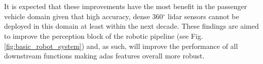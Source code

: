 \\\\
It is expected that these improvements have the most benefit in the passenger vehicle domain given that high accuracy, dense 360$^{\circ}$ lidar sensors cannot be deployed in this domain at least within the next decade. These findings are aimed to improve the perception block of the robotic pipeline (see Fig. \ref{fig:basic_robot_system}) and, as such, will improve the performance of all downstream functions making \gls{adas} features overall more robust.